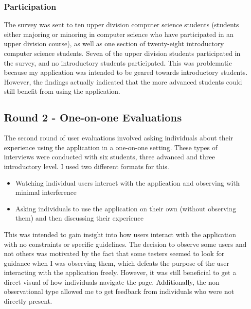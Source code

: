 \documentclass[10pt,twocolumn]{article}
\begin{document}
\subsubsection{Participation}

The survey was sent to ten upper division computer science students (students either majoring or minoring in computer science
who have participated in an upper division course), as well as one section of twenty-eight introductory computer science students.
Seven of the upper division students participated in the survey, and no introductory students participated. This was problematic 
because my application was intended to be geared towards introductory students. However, the findings actually 
indicated that the more advanced students could still benefit from using the application.



\subsection{Round 2 - One-on-one Evaluations}

The second round of user evaluations involved asking individuals about their experience using the application in a one-on-one 
setting. These types of interviews were conducted with six students, three advanced and three introductory level. I used two different formats for this. 
\begin{itemize}
    \item Watching individual users interact with the application and observing with minimal interference
    \item Asking individuals to use the application on their own (without observing them) and then discussing their experience
\end{itemize}

This was intended to gain insight into how users interact with the application with no constraints or specific guidelines. 
The decision to observe some users and not others was motivated by the fact that some testers 
seemed to look for guidance when I was observing them, which defeats the purpose of the user interacting 
with the application freely. However, it was still beneficial to get a direct visual of how individuals navigate the page.
Additionally, the non-observational type allowed me to get feedback from individuals who were not directly present.
\end{document}
